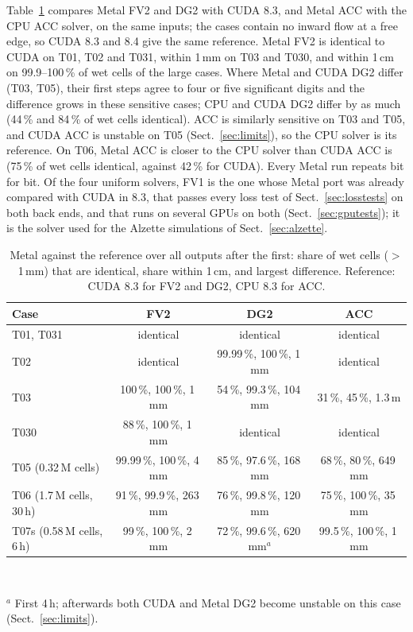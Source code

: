 \documentclass[draft,linenumbers]{agujournal2025}
\begin{document}
Table~\ref{tab:metal} compares Metal FV2 and DG2 with CUDA 8.3, and Metal ACC
with the CPU ACC solver, on the same inputs; the cases contain no inward
flow at a free edge, so CUDA 8.3 and 8.4 give the same reference. Metal FV2
is identical to CUDA on T01, T02 and T031, within 1\,mm on T03 and T030, and
within 1\,cm on 99.9--100\,\% of wet cells of the large cases. Where Metal and CUDA DG2 differ (T03, T05), their first steps agree to
four or five significant digits and the difference grows in these sensitive
cases; CPU and CUDA DG2 differ by as much (44\,\% and 84\,\% of wet cells
identical). ACC is similarly sensitive on T03 and T05, and CUDA ACC is
unstable on T05 (Sect.~\ref{sec:limits}), so the CPU solver is its reference.
On T06, Metal ACC is closer to the CPU solver than CUDA ACC is (75\,\% of
wet cells identical, against 42\,\% for CUDA). Every Metal run repeats bit
for bit. Of the four uniform solvers, FV1 is the one whose Metal port was
already compared with CUDA in 8.3, that passes every loss test of
Sect.~\ref{sec:losstests} on both back ends, and that runs on several GPUs on
both (Sect.~\ref{sec:gputests}); it is the solver used for the Alzette
simulations of Sect.~\ref{sec:alzette}.

\begin{table}[t]
\caption{Metal against the reference over all outputs after the first: share
of wet cells ($>$1\,mm) that are identical, share within 1\,cm, and largest
difference. Reference: CUDA 8.3 for FV2 and DG2, CPU 8.3 for ACC.}
\label{tab:metal}
\centering\small
\begin{tabular}{@{}lccc@{}}
\toprule
Case & FV2 & DG2 & ACC \\
\midrule
T01, T031 & identical & identical & identical \\
T02 & identical & 99.99\,\%, 100\,\%, 1\,mm & identical \\
T03 & 100\,\%, 100\,\%, 1\,mm & 54\,\%, 99.3\,\%, 104\,mm & 31\,\%, 45\,\%, 1.3\,m \\
T030 & 88\,\%, 100\,\%, 1\,mm & identical & identical \\
T05 (0.32\,M cells) & 99.99\,\%, 100\,\%, 4\,mm & 85\,\%, 97.6\,\%, 168\,mm & 68\,\%, 80\,\%, 649\,mm \\
T06 (1.7\,M cells, 30\,h) & 91\,\%, 99.9\,\%, 263\,mm & 76\,\%, 99.8\,\%, 120\,mm & 75\,\%, 100\,\%, 35\,mm \\
T07s (0.58\,M cells, 6\,h) & 99\,\%, 100\,\%, 2\,mm & 72\,\%, 99.6\,\%, 620\,mm$^{a}$ & 99.5\,\%, 100\,\%, 1\,mm \\
\bottomrule
\end{tabular}
\\[2pt]\begin{minipage}{\textwidth}\footnotesize $^{a}$ First 4\,h; afterwards both CUDA and Metal DG2
become unstable on this case (Sect.~\ref{sec:limits}).\end{minipage}
\end{table}
\end{document}
